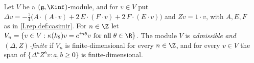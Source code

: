 Let $V$ be a $(\mathfrak g,\Kinf)$-module, and for $v\in V$ put
$\Delta v=-\frac14\bigl(A\cdot(A\cdot v)+2\,E\cdot(F\cdot v)+2\,F\cdot(E\cdot v)\bigr)$ and $Zv=1\cdot v$, with $A,E,F$ as
in \cref{I.rep.def:casimir}. For $n\in\Z$ let $V_n=\{v\in V:\kappa(k_\theta)v=e^{in\theta}v\text{ for all }\theta\in\R\}$.
The module $V$ is \emph{admissible and $(\Delta,Z)$-finite} if $V_n$ is finite-dimensional for every $n\in\Z$, and
for every $v\in V$ the span of $\{\Delta^aZ^bv:a,b\ge0\}$ is finite-dimensional.
